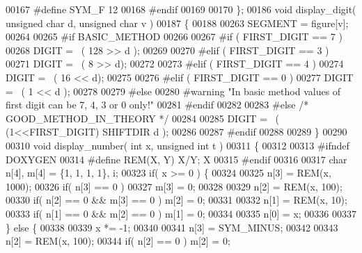 \begin{DoxyCode}
00167 \textcolor{preprocessor}{}\textcolor{preprocessor}{#define SYM\_F 12}
00168 \textcolor{preprocessor}{}\textcolor{preprocessor}{#endif}
00169 \textcolor{preprocessor}{}
00170 \}; 
00186 \textcolor{keywordtype}{void} display_digit( \textcolor{keywordtype}{unsigned} \textcolor{keywordtype}{char} d, \textcolor{keywordtype}{unsigned} \textcolor{keywordtype}{char} v )
00187 \{
00188 
00263   SEGMENT = figure[v];
00264 
00265 \textcolor{preprocessor}{  #if BASIC\_METHOD}
00266 \textcolor{preprocessor}{}
00267 \textcolor{preprocessor}{   #if ( FIRST\_DIGIT == 7 )}
00268 \textcolor{preprocessor}{}   DIGIT = ~( 128 >> d );
00269 
00270 \textcolor{preprocessor}{   #elif ( FIRST\_DIGIT == 3 )}
00271 \textcolor{preprocessor}{}   DIGIT = ~( 8 >> d);
00272 
00273 \textcolor{preprocessor}{   #elif ( FIRST\_DIGIT == 4 )}
00274 \textcolor{preprocessor}{}   DIGIT = ~( 16 << d);
00275 
00276 \textcolor{preprocessor}{   #elif ( FIRST\_DIGIT == 0 )}
00277 \textcolor{preprocessor}{}   DIGIT = ~( 1 << d );
00278 
00279 \textcolor{preprocessor}{   #else}
00280 \textcolor{preprocessor}{}\textcolor{preprocessor}{   #warning "In basic method values of first digit can be 7, 4, 3 or 0 only!"}
00281 \textcolor{preprocessor}{}\textcolor{preprocessor}{   #endif}
00282 \textcolor{preprocessor}{}
00283 \textcolor{preprocessor}{  #else }\textcolor{comment}{/* GOOD\_METHOD\_IN\_THEORY */}
00284 
00285   DIGIT = ~( (1<<FIRST\_DIGIT) SHIFTDIR d );
00286 
00287 \textcolor{preprocessor}{  #endif}
00288 \textcolor{preprocessor}{}
00289 \}
00290 
00310 \textcolor{keywordtype}{void} display_number( \textcolor{keywordtype}{int} x, \textcolor{keywordtype}{unsigned} \textcolor{keywordtype}{int} t )
00311 \{
00312 
00313 \textcolor{preprocessor}{#ifndef DOXYGEN}
00314 \textcolor{preprocessor}{}\textcolor{preprocessor}{#define REM(X, Y) X/Y; X %
00315 \textcolor{preprocessor}{}\textcolor{preprocessor}{#endif}
00316 \textcolor{preprocessor}{}
00317   \textcolor{keywordtype}{char} n[4], m[4] = \{1, 1, 1, 1\}, i;
00323   \textcolor{keywordflow}{if}( x >= 0 ) \{
00324 
00325   n[3] = REM(x, 1000);
00326   \textcolor{keywordflow}{if}( n[3] == 0 )
00327    m[3] = 0;
00328 
00329   n[2] = REM(x, 100);
00330   \textcolor{keywordflow}{if}( n[2] == 0 && m[3] == 0 ) m[2] = 0;
00331 
00332   n[1] = REM(x, 10);
00333   \textcolor{keywordflow}{if}( n[1] == 0 && m[2] == 0 ) m[1] = 0;
00334 
00335   n[0] = x;
00336 
00337   \} \textcolor{keywordflow}{else} \{
00338 
00339   x *= -1;
00340 
00341   n[3] = SYM\_MINUS;
00342 
00343   n[2] = REM(x, 100);
00344   \textcolor{keywordflow}{if}( n[2] == 0 ) m[2] = 0;
}
\end{DoxyCode}
